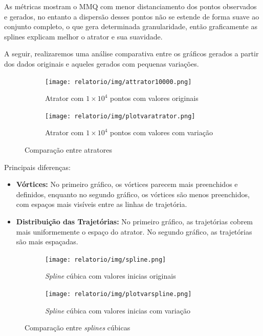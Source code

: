 \documentclass[12pt, a4paper]{article}
\begin{document}
As  métricas mostram o MMQ com menor distanciamento dos pontos observados e gerados, no entanto a dispersão desses pontos não se estende de forma suave ao conjunto completo, o que gera determinada granularidade, então graficamente as splines explicam melhor o atrator e sua suavidade.

A seguir, realizaremos uma análise comparativa entre os gráficos gerados a
partir dos dados originais e aqueles gerados com pequenas variações.

\begin{figure}[H]
    \centering
    \begin{subfigure}{0.45\textwidth}
        \centering
        \texttt{[image: relatorio/img/attrator10000.png]}
        \caption{Atrator com $1 \times 10^4$ pontos com valores originais}
        \label{fig:imagemfgh1}
    \end{subfigure}
    \hfill
    \begin{subfigure}{0.45\textwidth}
        \centering
        \texttt{[image: relatorio/img/plotvaratrator.png]}
        \caption{Atrator com $1 \times 10^4$ pontos com valores com variação}
        \label{fig:imagngfem2}
    \end{subfigure}
    \caption{Comparação entre atratores}
    \label{fig:duas_imajygens}
\end{figure}

Principais diferenças:
\begin{itemize}
    \item \textbf{Vórtices:} No primeiro gráfico, os vórtices parecem mais
          preenchidos e definidos, enquanto no segundo gráfico, os vórtices são
          menos
          preenchidos, com espaços mais visíveis entre as linhas de trajetória.

    \item \textbf{Distribuição das Trajetórias: }No primeiro gráfico, as
          trajetórias cobrem mais uniformemente o espaço do atrator. No segundo
          gráfico,
          as trajetórias são mais espaçadas.
\end{itemize}

\begin{figure}[H]
    \centering
    \begin{subfigure}{1.0\textwidth}
        \centering
        \texttt{[image: relatorio/img/spline.png]}
        \caption{\textit{Spline} cúbica com valores inicias originais}
        \label{fig:spline-original}
    \end{subfigure}
    \vfill
    \begin{subfigure}{1.0\textwidth}
        \centering
        \texttt{[image: relatorio/img/plotvarspline.png]}
        \caption{\textit{Spline} cúbica com valores inicias com variação}
        \label{fig:spline-va}
    \end{subfigure}
    \caption{Comparação entre \textit{splines} cúbicas}
    \label{fig:comparacao-splines}
\end{figure}
\end{document}
